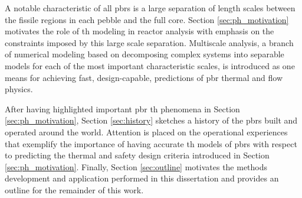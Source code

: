 A notable characteristic of all \glspl{pbr} is a large separation of length scales between the fissile regions in each pebble and the full core. Section \ref{sec:ph_motivation} motivates the role of \gls{th} modeling in reactor analysis with emphasis on the constraints imposed by this large scale separation. Multiscale analysis, a branch of numerical modeling based on decomposing complex systems into separable models for each of the most important characteristic scales, is introduced as one means for achieving fast, design-capable, predictions of \gls{pbr} thermal and flow physics.

After having highlighted important \gls{pbr} \gls{th} phenomena in Section \ref{sec:ph_motivation}, Section \ref{sec:history} sketches a history of the \glspl{pbr} built and operated around the world. Attention is placed on the operational experiences that exemplify the importance of having accurate \gls{th} models of \glspl{pbr} with respect to predicting the thermal and safety design criteria introduced in Section \ref{sec:ph_motivation}. Finally, Section \ref{sec:outline} motivates the methods development and application performed in this dissertation and provides an outline for the remainder of this work.










